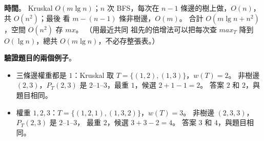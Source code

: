 \begin{pastsoln}
\textbf{時間}。 Kruskal $O(m \lg n)$；$n$ 次 BFS，每次在 $n - 1$ 條邊的樹上做，$O(n)$，共 $O(n^2)$；最後
看 $m - (n - 1)$ 條非樹邊，$O(m)$。 合計 $O(m \lg n + n^2)$，空間 $O(n^2)$ 存 $\mathit{mx}$。 （用最近共同
祖先的倍增法可以把每次查 $\mathit{max}_T$ 降到 $O(\lg n)$，總共 $O(m \lg n)$，不必存整張表。）

\textbf{驗證題目的兩個例子}。
\begin{itemize}
\item 三條邊權重都是 $1$：Kruskal 取 $T = \{(1,2), (1,3)\}$，$w(T) = 2$。 非樹邊 $(2, 3)$，$P_T(2, 3)$ 是
$2$--$1$--$3$，最重 $1$，候選 $2 + 1 - 1 = 2$。 答案 $2$ 和 $2$，與題目相同。
\item 權重 $1, 2, 3$：$T = \{(1,2,1), (1,3,2)\}$，$w(T) = 3$。 非樹邊 $(2, 3, 3)$，$P_T(2, 3)$ 是 $2$--$1$--$3$，
最重 $2$，候選 $3 + 3 - 2 = 4$。 答案 $3$ 和 $4$，與題目相同。
\end{itemize}
\end{pastsoln}
